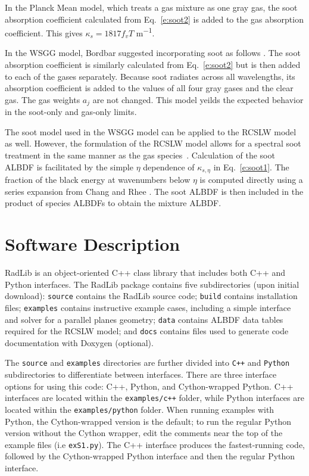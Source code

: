\documentclass[preprint,12pt]{elsarticle}
\newcounter{bla}
\begin{document}
In the Planck Mean model, which treats a gas mixture as one gray gas, the soot absorption coefficient calculated from Eq.~\ref{e:soot2} is added to the gas absorption coefficient. This gives $\kappa_s=1817f_vT$ \si{m^{-1}}.
 
In the WSGG model, Bordbar suggested incorporating soot as follows \cite{Bordbar_personal}. The soot absorption coefficient is similarly calculated from Eq.~\ref{e:soot2} but is then added to each of the gases separately. Because soot radiates across all wavelengths, its absorption coefficient is added to the values of all four gray gases and the clear gas. The gas weights $a_j$ are not changed. This model yeilds the expected behavior in the soot-only and gas-only limits.

The soot model used in the WSGG model can be applied to the RCSLW model as well. However, the formulation of the RCSLW model allows for a spectral soot treatment in the same manner as the gas species~\cite{Solovjov_2001}. Calculation of the soot ALBDF is facilitated by the simple $\eta$ dependence of $\kappa_{s,\eta}$ in Eq.~\ref{e:soot1}. The fraction of the black energy at wavenumbers below $\eta$ is computed directly using a series expansion from Chang and Rhee \cite{Chang_1984,Solovjov_2001}. The soot ALBDF is then included in the product of species ALBDFs to obtain the mixture ALBDF. 
 

\section{Software Description} \label{s:architechture}

RadLib is an object-oriented C++ class library that includes both C++ and Python interfaces. The RadLib package contains five subdirectories (upon initial download): \texttt{source} contains the RadLib source code; \texttt{build} contains installation files; \texttt{examples} contains instructive example cases, including a simple interface and solver for a parallel planes geometry; \texttt{data} contains ALBDF data tables required for the RCSLW model; and \texttt{docs} contains files used to generate code documentation with Doxygen (optional). 

The \texttt{source} and \texttt{examples} directories are further divided into \texttt{C++} and \texttt{Python} subdirectories to differentiate between interfaces. There are three interface options for using this code: C++, Python, and Cython-wrapped Python. C++ interfaces are located within the \texttt{examples/c++} folder, while Python interfaces are located within the \texttt{examples/python} folder. When running examples with Python, the Cython-wrapped version is the default; to run the regular Python version without the Cython wrapper, edit the comments near the top of the example files (i.e \texttt{ex\textunderscore S1.py}). The C++ interface produces the fastest-running code, followed by the Cython-wrapped Python interface and then the regular Python interface.
\end{document}

